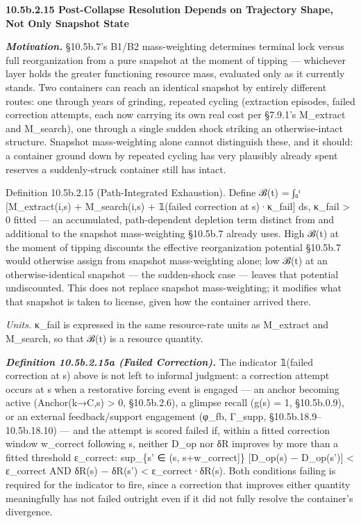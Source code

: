 \documentclass[
]{article}
\begin{document}
\textbf{10.5b.2.15 Post-Collapse Resolution Depends on Trajectory Shape,
Not Only Snapshot State}

\emph{\textbf{Motivation.}} §10.5b.7's B1/B2 mass-weighting determines
terminal lock versus full reorganization from a pure snapshot at the
moment of tipping --- whichever layer holds the greater functioning
resource mass, evaluated only as it currently stands. Two containers can
reach an identical snapshot by entirely different routes: one through
years of grinding, repeated cycling (extraction episodes, failed
correction attempts, each now carrying its own real cost per §7.9.1's
M\_extract and M\_search), one through a single sudden shock striking an
otherwise-intact structure. Snapshot mass-weighting alone cannot
distinguish these, and it should: a container ground down by repeated
cycling has very plausibly already spent reserves a suddenly-struck
container still has intact.

Definition 10.5b.2.15 (Path-Integrated Exhaustion). Define ℬ(t) = ∫₀ᵗ
{[}M\_extract(i,s) + M\_search(i,s) + 𝟙(failed correction at
s)·κ\_fail{]} ds, κ\_fail \textgreater{} 0 fitted --- an accumulated,
path-dependent depletion term distinct from and additional to the
snapshot mass-weighting §10.5b.7 already uses. High ℬ(t) at the moment
of tipping discounts the effective reorganization potential §10.5b.7
would otherwise assign from snapshot mass-weighting alone; low ℬ(t) at
an otherwise-identical snapshot --- the sudden-shock case --- leaves
that potential undiscounted. This does not replace snapshot
mass-weighting; it modifies what that snapshot is taken to license,
given how the container arrived there.

\emph{Units.} κ\_fail is expressed in the same resource-rate units as
M\_extract and M\_search, so that ℬ(t) is a resource quantity.

\emph{\textbf{Definition 10.5b.2.15a (Failed Correction).}} The
indicator 𝟙(failed correction at s) above is not left to informal
judgment: a correction attempt occurs at s when a restorative forcing
event is engaged --- an anchor becoming active (Anchor(k→C,s)
\textgreater{} 0, §10.5b.2.6), a glimpse recall (g(s) = 1, §10.5b.0.9),
or an external feedback/support engagement (φ\_fb, Γ\_supp,
§10.5b.18.9--10.5b.18.10) --- and the attempt is scored failed if,
within a fitted correction window w\_correct following s, neither D\_op
nor δR improves by more than a fitted threshold ε\_correct: sup\_\{s' ∈
(s, s+w\_correct{]}\} {[}D\_op(s) − D\_op(s'){]} \textless{} ε\_correct
AND δR(s) − δR(s') \textless{} ε\_correct·δR(s). Both conditions failing
is required for the indicator to fire, since a correction that improves
either quantity meaningfully has not failed outright even if it did not
fully resolve the container's divergence.
\end{document}
